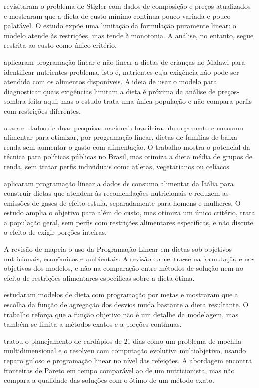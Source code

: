 \documentclass[12pt]{article}
\begin{document}
\cite{garille2001} revisitaram o problema de Stigler com dados de composição e preços
atualizados e mostraram que a dieta de custo mínimo continua pouco variada e pouco
palatável. O estudo expõe uma limitação da formulação puramente linear: o modelo
atende às restrições, mas tende à monotonia. A análise, no entanto, segue restrita ao
custo como único critério.

\cite{darmon2002} aplicaram programação linear e não linear a dietas de crianças no
Malawi para identificar nutrientes-problema, isto é, nutrientes cuja exigência não pode
ser atendida com os alimentos disponíveis. A ideia de usar o modelo para diagnosticar
quais exigências limitam a dieta é próxima da análise de preços-sombra feita aqui, mas o
estudo trata uma única população e não compara perfis com restrições diferentes.

\cite{verly2019} usaram dados de duas pesquisas nacionais brasileiras de orçamento e
consumo alimentar para otimizar, por programação linear, dietas de famílias de baixa
renda sem aumentar o gasto com alimentação. O trabalho mostra o potencial da técnica
para políticas públicas no Brasil, mas otimiza a dieta média de grupos de renda, sem
tratar perfis individuais como atletas, vegetarianos ou celíacos.

\cite{ferrari2020} aplicaram programação linear a dados de consumo alimentar da Itália
para construir dietas que atendem às recomendações nutricionais e reduzem as emissões
de gases de efeito estufa, separadamente para homens e mulheres. O estudo amplia o objetivo para além do custo, mas otimiza um único critério, trata a
população geral, sem perfis com restrições alimentares específicas, e não discute o
efeito de exigir porções inteiras.

A revisão de \cite{vandooren2018} mapeia o uso da Programação Linear em dietas sob
objetivos nutricionais, econômicos e ambientais. A revisão concentra-se na formulação e nos objetivos dos modelos, e não na comparação
entre métodos de solução nem no efeito de restrições alimentares específicas sobre a
dieta ótima.

\cite{gerdessen2015} estudaram modelos de dieta com programação por metas e mostraram
que a escolha da função de agregação dos desvios muda bastante a dieta resultante. O
trabalho reforça que a função objetivo não é um detalhe da modelagem, mas também se
limita a métodos exatos e a porções contínuas.

\cite{seljak2009} tratou o planejamento de cardápios de 21 dias como um problema de
mochila multidimensional e o resolveu com computação evolutiva multiobjetivo, usando
reparo guloso e programação linear no nível das refeições. A abordagem encontra
fronteiras de Pareto em tempo comparável ao de um nutricionista, mas não compara a
qualidade das soluções com o ótimo de um método exato.
\end{document}
